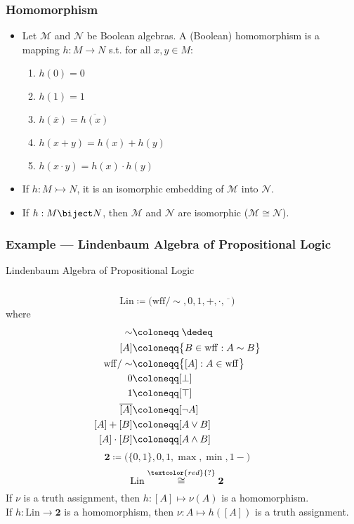 \documentclass[UTF8,11pt,colorlinks,compress,openany]{beamer}%
\begin{document}
\begin{frame}\frametitle{Homomorphism}
	\begin{itemize}
		\item Let $\mathcal{M}$ and $\mathcal{N}$ be Boolean algebras. A (Boolean) homomorphism is a mapping $h: M\to N$ s.t. for all $x,y\in M$:
		\begin{enumerate}
			\item $h(0)=0$
			\item $h(1)=1$
			\item $h(\overline{x})=\overline{h(x)}$
			\item $h(x+y)=h(x)+h(y)$
			\item $h(x\cdot y)=h(x)\cdot h(y)$
		\end{enumerate}
		\item If $h: M\rightarrowtail N$, it is an isomorphic embedding of $\mathcal{M}$ into $\mathcal{N}$.
		\item If $h: M\biject N$, then $\mathcal{M}$ and $\mathcal{N}$ are isomorphic ($\mathcal{M}\cong\mathcal{N}$). 
	\end{itemize}
\end{frame}

\begin{frame}\frametitle{Example --- Lindenbaum Algebra of Propositional Logic}
\setlength\abovedisplayskip{0pt}
\setlength\belowdisplayskip{0pt}
	\begin{block}{Lindenbaum Algebra of Propositional Logic}
	\begin{columns}
		\[\mathrm{Lin}\coloneqq \big(\mathrm{wff}/\sim,0,1,+,\cdot,\overline{\phantom{x}}\big)\]
		where 
		\begin{align*}
		\sim&\coloneqq \;\dedeq\\
		[A]&\coloneqq \big\{B\in\mathrm{wff}: A\sim B\big\}\\
		\mathrm{wff}/\sim&\coloneqq \big\{[A]: A\in\mathrm{wff}\big\}\\
		0&\coloneqq [\bot]\\
		1&\coloneqq [\top]\\
		\overline{[A]}&\coloneqq [\neg A]\\
		[A]+[B]&\coloneqq [A\vee B]\\
		[A]\cdot[B]&\coloneqq [A\wedge B]
		\end{align*}
		\[\mathbf{2}\coloneqq \Big(\{0,1\},0,1,\max,\min,1-\Big)\]
		\[\mathrm{Lin}\stackrel{\textcolor{red}{?}}{\cong}\mathbf{2}\]
		If $\nu$ is a truth assignment, then $h: [A]\mapsto\nu(A)$ is a homomorphism.\\
		If $h:\mathrm{Lin}\to\mathbf{2}$ is a homomorphism, then $\nu: A\mapsto h([A])$ is a truth assignment.
	\end{columns}
	\end{block}
\end{frame}
\end{document}
